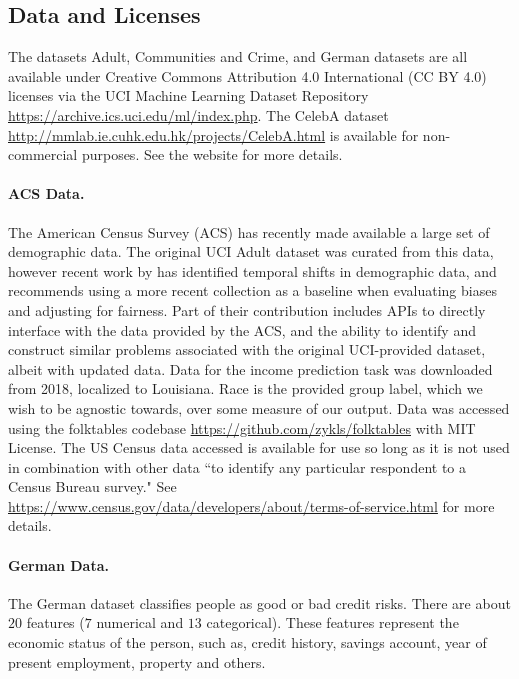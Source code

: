 \subsection{Data and Licenses}

The datasets Adult, Communities and Crime, and German datasets are all available under Creative Commons Attribution 4.0 International (CC BY 4.0) licenses via the UCI Machine Learning Dataset Repository \url{https://archive.ics.uci.edu/ml/index.php}.
The CelebA dataset \url{http://mmlab.ie.cuhk.edu.hk/projects/CelebA.html} is available for non-commercial purposes. See the website for more details.

\paragraph{ACS Data.}
The American Census Survey (ACS) has recently made available a large set of demographic data. The original UCI Adult dataset \citep{uci} was curated from this data, however recent work by \cite{ding2021retiring} has identified temporal shifts in demographic data, and recommends using a more recent collection as a baseline when evaluating biases and adjusting for fairness.
Part of their contribution includes APIs to directly interface with the data provided by the ACS, and the ability to identify and construct similar problems associated with the original UCI-provided dataset, albeit with updated data. Data for the income prediction task was downloaded from 2018, localized to Louisiana. 
Race is the provided group label, which we wish to be agnostic towards, over some measure of our output.
Data was accessed using the folktables codebase \url{https://github.com/zykls/folktables} with MIT License. The US Census data accessed is available for use so long as it is not used in combination with other data ``to identify any particular respondent to a Census Bureau survey." See \url{https://www.census.gov/data/developers/about/terms-of-service.html} for more details.

\paragraph{German Data.}
 The German dataset classifies people as good or bad credit risks. There are about $20$ features ($7$ numerical and $13$ categorical). These features represent the economic status of the person, such as, credit history, savings account, year of present employment, property and others.
 
